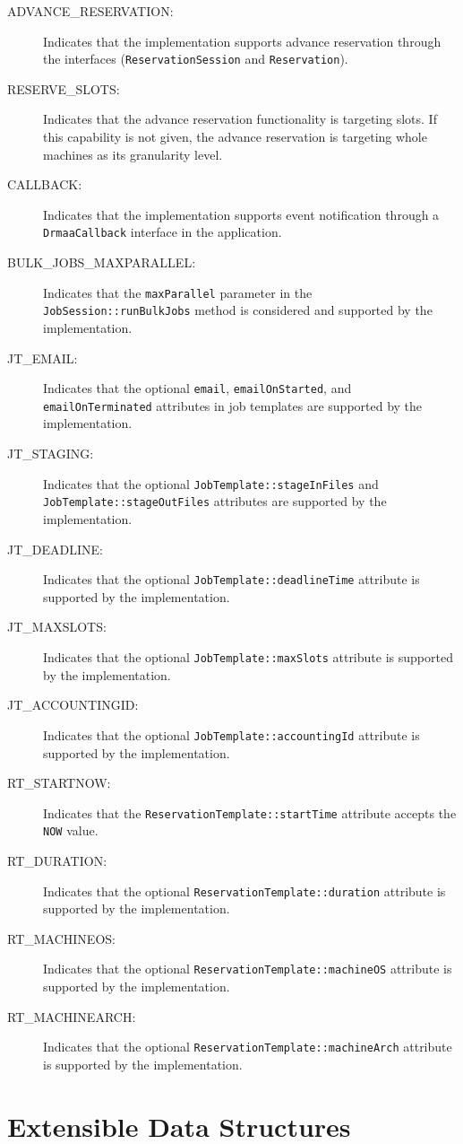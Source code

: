 \documentclass{article}
\newcommand{\h}[1]{\lstinline|#1|}
\begin{document}
\begin{description}
\item[ADVANCE\_RESERVATION:] Indicates that the implementation supports advance reservation through the interfaces (\h{ReservationSession} and \h{Reservation}).
\item[RESERVE\_SLOTS:] Indicates that the advance reservation functionality is targeting slots. If this capability is not given, the advance reservation is targeting whole machines as its granularity level.   
\item[CALLBACK:] Indicates that the implementation supports event notification through a \h{DrmaaCallback} interface in the application. 
\item[BULK\_JOBS\_MAXPARALLEL:] Indicates that the \h{maxParallel} parameter in the \h{JobSession::runBulkJobs} method is considered and supported by the implementation.
\item[JT\_EMAIL:] Indicates that the optional \h{email}, \h{emailOnStarted}, and \h{emailOnTerminated} attributes in job templates are supported by the implementation.
\item[JT\_STAGING:] Indicates that the optional \h{JobTemplate::stageInFiles} and \h{JobTemplate::stageOutFiles} attributes are supported by the implementation.
\item[ JT\_DEADLINE:] Indicates that the optional \h{JobTemplate::deadlineTime} attribute is supported by the implementation.
\item[ JT\_MAXSLOTS:] Indicates that the optional \h{JobTemplate::maxSlots} attribute is supported by the implementation.
\item[JT\_ACCOUNTINGID:] Indicates that the optional \h{JobTemplate::accountingId} attribute is supported by the implementation.
\item[RT\_STARTNOW:] Indicates that the \h{ReservationTemplate::startTime} attribute accepts the \h{NOW} value.
\item[RT\_DURATION:] Indicates that the optional \h{ReservationTemplate::duration} attribute is supported by the implementation.
\item[RT\_MACHINEOS:] Indicates that the optional \h{ReservationTemplate::machineOS} attribute is supported by the implementation.
\item[RT\_MACHINEARCH:] Indicates that the optional \h{ReservationTemplate::machineArch} attribute is supported by the implementation.
\end{description}

\section{Extensible Data Structures}
\label{sec:structextension}
\end{document}
